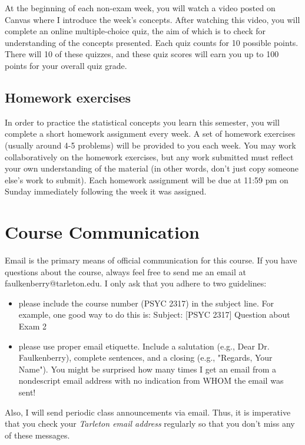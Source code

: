 \documentclass[10pt]{article}
\begin{document}
At the beginning of each non-exam week, you will watch a video posted on Canvas where I introduce the week's concepts. After watching this video, you will complete an online multiple-choice quiz, the aim of which is to check for understanding of the concepts presented. Each quiz counts for 10 possible points. There will 10 of these quizzes, and these quiz scores will earn you up to 100 points for your overall quiz grade.

\subsection*{Homework exercises}
\label{sec:orgc129439}
In order to practice the statistical concepts you learn this semester, you will complete a short homework assignment every week. A set of homework exercises (usually around 4-5 problems) will be provided to you each week. You may work collaboratively on the homework exercises, but any work submitted must reflect your own understanding of the material (in other words, don't just copy someone else's work to submit).  Each homework assignment will be due at 11:59 pm on Sunday immediately following the week it was assigned.

\section*{Course Communication}
\label{sec:org322de6d}

Email is the primary means of official communication for this course.  If you have questions about the course, always feel free to send me an email at faulkenberry@tarleton.edu.  I only ask that you adhere to two guidelines:
\begin{itemize}
\item please include the course number (PSYC 2317) in the subject line.  For example, one good way to do this is:  Subject: [PSYC 2317] Question about Exam 2
\item please use proper email etiquette.  Include a salutation (e.g., Dear Dr. Faulkenberry), complete sentences, and a closing (e.g., "Regards, Your Name").  You might be surprised how many times I get an email from a nondescript email address with no indication from WHOM the email was sent!
\end{itemize}

Also, I will send periodic class announcements via email.  Thus, it is imperative that you check your \emph{Tarleton email address} regularly so that you don't miss any of these messages.
\end{document}
